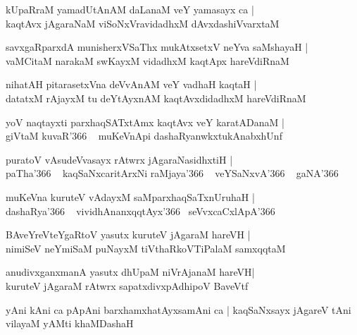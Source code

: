 \documentclass[twoside,12pt,openright]{book}
\newcounter{shloka}[chapter]
\begin{document}
\begin{shloka}%
kUpaRraM yamadUtAnAM daLanaM veY yamasayx ca |\\
kaqtAvx jAgaraNaM viSoNxVravidadhxM dAvxdashiVvarxtaM
\end{shloka}

\begin{shloka}%
savxgaRparxdA munisherxVSaThx mukAtxsetxV neYva saMshayaH |\\
vaMCitaM narakaM swKayxM vidadhxM kaqtApx hareVdiRnaM 
\end{shloka}

\begin{shloka}%
nihatAH pitarasetxVna deVvAnAM veY vadhaH kaqtaH |\\
datatxM rAjayxM tu deYtAyxnAM kaqtAvxdidadhxM hareVdiRnaM 
\end{shloka}

\begin{shloka}%
yoV naqtayxti parxhaqSATxtAmx kaqtAvx veY karatADanaM |\\
giVtaM kuvaR\char'366 ~ muKeVnApi dashaRyanwkxtukAnabxhUnf
\end{shloka}

\begin{shloka}%
puratoV vAsudeVvasayx rAtwrx jAgaraNasidhxtiH |\\
paTha\char'366 ~ kaqSaNxcaritArxNi raMjaya\char'366 ~ veYSaNxvA\char'366 ~ gaNA\char'366
\end{shloka}

\begin{shloka}%
muKeVna  kuruteV vAdayxM saMparxhaqSaTxnUruhaH |\\
dashaRya\char'366 ~ vividhAnanxqqtAyx\char'366 ~seVvxcaCxlApA\char'366
\end{shloka}

\begin{shloka}%
BAveYreVteYgaRtoV yasutx kuruteV jAgaraM hareVH |\\
nimiSeV neYmiSaM puNayxM tiVthaRkoVTiPalaM samxqqtaM
\end{shloka}

\begin{shloka}%
anudivxganxmanA yasutx dhUpaM niVrAjanaM hareVH|\\
kuruteV jAgaraM rAtwrx sapatxdivxpAdhipoV BaveVtf
\end{shloka}

\begin{shloka}%
yAni kAni ca pApAni barxhamxhatAyxsamAni ca |
kaqSaNxsayx jAgareV tAni vilayaM yAMti khaMDashaH
\end{shloka}
\end{document}
